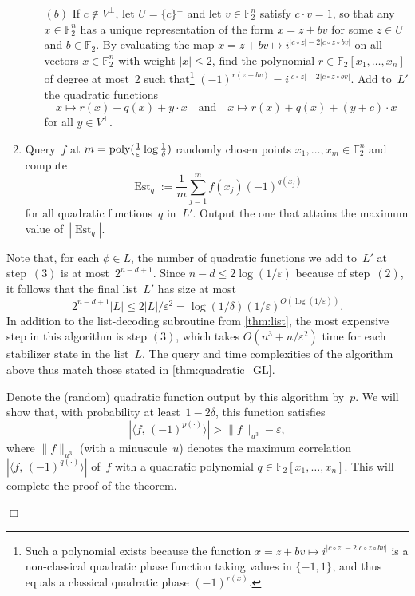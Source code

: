 \documentclass[11pt]{amsart}
\newcommand{\F}{\mathbb{F}} %
\newcommand{\pmset}[1]{\{-1,1\}^{#1}} %
\newcommand{\eps}{\varepsilon}
\newcommand{\poly}{\mbox{\rm poly}}
\DeclareMathOperator{\Est}{Est}
\theoremstyle{plain}
\theoremstyle{definition}
\theoremstyle{remark}
\renewenvironment{proof}[1][]{
    	\begin{trivlist}
     	\item[\hspace{\labelsep}{\em\noindent Proof#1:\/}]}
     	{{\hfill$\Box$}
    	\end{trivlist}
  }
\begin{document}
\begin{proof}[ of \cref{thm:quadratic_GL}]
\begin{enumerate}
\begin{itemize}
        \item[$(b)$] If $c\notin V^\perp$, let $U = \{c\}^\perp$ and let $v\in \F_2^n$ satisfy $c\cdot v = 1$, so that any $x\in\F_2^n$ has a unique representation of the form $x = z+bv$ for some $z\in U$ and $b\in \F_2$.
        By evaluating the map $x = z+bv \mapsto i^{|c\circ z| - 2|c\circ z\circ bv|}$ on all vectors $x\in \F_2^n$ with weight $|x| \leq 2$, find the polynomial $r\in \F_2[x_1,\dots,x_n]$ of degree at most~2 such that\footnote{Such a polynomial exists because the function $x = z+bv \mapsto i^{|c\circ z| - 2|c\circ z\circ bv|}$ is a non-classical quadratic phase function taking values in $\pmset{}$, and thus equals a classical quadratic phase $(-1)^{r(x)}$.}
        $(-1)^{r(z+bv)} = i^{|c\circ z| - 2|c\circ z\circ bv|}$.
        Add to~$L'$ the quadratic functions
        $$x\mapsto r(x)+q(x)+y\cdot x \quad \text{and} \quad x\mapsto r(x)+q(x)+ (y+c)\cdot x$$
        for all $y\in V^{\perp}$.
    \end{itemize}
    
    \item Query~$f$ at $m = \poly(\tfrac{1}{\eps} \log \tfrac{1}{\delta})$ randomly chosen points $x_1, \dots, x_m \in \F_2^n$ and compute
    $$\Est_q := \frac{1}{m} \sum_{j=1}^m f(x_j) (-1)^{q(x_j)}$$
    for all quadratic functions~$q$ in~$L'$.
    Output the one that attains the maximum value of~$|\Est_q|$.
\end{enumerate}

Note that, for each $\phi\in L$, the number of quadratic functions we add to~$L'$ at step~$(3)$ is at most~$2^{n-d+1}$.
Since $n-d \leq 2\log(1/\eps)$ because of step~$(2)$, it follows that the final list~$L'$ has size at most
$$2^{n-d+1} |L| \leq 2|L|/\eps^2 = \log(1/\delta) (1/\eps)^{O(\log(1/\eps))}.$$
In addition to the list-decoding subroutine from \cref{thm:list}, the most expensive step in this algorithm is step $(3)$, which takes $O(n^3 + n/\eps^2)$ time for each stabilizer state in the list~$L$.
The query and time complexities of the algorithm above thus match those stated in \cref{thm:quadratic_GL}.

Denote the (random) quadratic function output by this algorithm by~$p$.
We will show that, with probability at least~$1-2\delta$, this function satisfies
\begin{equation} \label{eq:high_corr}
    |\langle f,\, (-1)^{p(\cdot)}\rangle| > \|f\|_{u^3} - \eps,
\end{equation}
where $\|f\|_{u^3}$ (with a minuscule~$u$) denotes the maximum correlation $|\langle f,\, (-1)^{q(\cdot)}\rangle|$ of~$f$ with a quadratic polynomial $q\in \F_2[x_1, \dots, x_n]$.
This will complete the proof of the theorem.


\end{proof}
\end{document}
